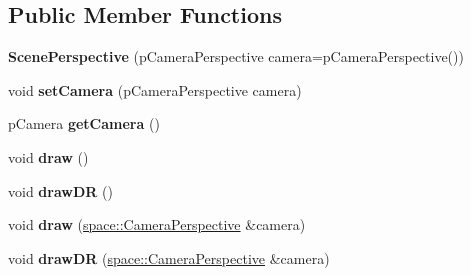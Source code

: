 \subsection*{Public Member Functions}
\begin{DoxyCompactItemize}
\item 
\hypertarget{classfillwave_1_1models_1_1ScenePerspective_aeeb4b4c7079500335352e21492c102b6}{}{\bfseries Scene\+Perspective} (p\+Camera\+Perspective camera=p\+Camera\+Perspective())\label{classfillwave_1_1models_1_1ScenePerspective_aeeb4b4c7079500335352e21492c102b6}

\item 
\hypertarget{classfillwave_1_1models_1_1ScenePerspective_a02e7b00fd4fceeaa37fdb8850d2f7843}{}void {\bfseries set\+Camera} (p\+Camera\+Perspective camera)\label{classfillwave_1_1models_1_1ScenePerspective_a02e7b00fd4fceeaa37fdb8850d2f7843}

\item 
\hypertarget{classfillwave_1_1models_1_1ScenePerspective_aa30c9eed2045bc0fa171ea5e001e0157}{}p\+Camera {\bfseries get\+Camera} ()\label{classfillwave_1_1models_1_1ScenePerspective_aa30c9eed2045bc0fa171ea5e001e0157}

\item 
\hypertarget{classfillwave_1_1models_1_1ScenePerspective_aab60a6a9df8fbf2e7fed507791cec81c}{}void {\bfseries draw} ()\label{classfillwave_1_1models_1_1ScenePerspective_aab60a6a9df8fbf2e7fed507791cec81c}

\item 
\hypertarget{classfillwave_1_1models_1_1ScenePerspective_a7ccbdcf2f6f380508b865fde68ad8025}{}void {\bfseries draw\+D\+R} ()\label{classfillwave_1_1models_1_1ScenePerspective_a7ccbdcf2f6f380508b865fde68ad8025}

\item 
\hypertarget{classfillwave_1_1models_1_1ScenePerspective_a5406a52a2a078c8bb9ed274f79fa29f5}{}void {\bfseries draw} (\hyperlink{classfillwave_1_1space_1_1CameraPerspective}{space\+::\+Camera\+Perspective} \&camera)\label{classfillwave_1_1models_1_1ScenePerspective_a5406a52a2a078c8bb9ed274f79fa29f5}

\item 
\hypertarget{classfillwave_1_1models_1_1ScenePerspective_abf997a67cfe68ee78b6f1848719f6270}{}void {\bfseries draw\+D\+R} (\hyperlink{classfillwave_1_1space_1_1CameraPerspective}{space\+::\+Camera\+Perspective} \&camera)\label{classfillwave_1_1models_1_1ScenePerspective_abf997a67cfe68ee78b6f1848719f6270}


\end{DoxyCompactItemize}

